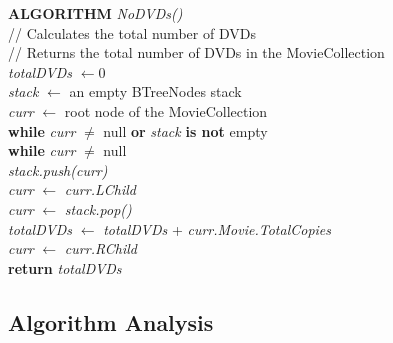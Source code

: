 \documentclass[12pt,a4paper]{article}
\begin{document}
			\textbf{ALGORITHM} \textit{NoDVDs()}\\
			\null\hspace{1cm}// Calculates the total number of DVDs\\
			\null\hspace{1cm}// Returns the total number of DVDs in the MovieCollection\\
			\null\hspace{1cm}\textit{totalDVDs} $\leftarrow 0$\\
			\null\hspace{1cm}\textit{stack} $\leftarrow$ an empty BTreeNodes stack\\
			\null\hspace{1cm}\textit{curr} $\leftarrow$ root node of the MovieCollection\\
			\null\hspace{1cm}\textbf{while} \textit{curr} $\neq$ null \textbf{or} 
			\textit{stack} \textbf{is not} empty\\
			\null\hspace{2cm}\textbf{while} \textit{curr} $\neq$ null\\
			\null\hspace{3cm}\textit{stack.push(curr)}\\
			\null\hspace{3cm}\textit{curr} $\leftarrow$ \textit{curr.LChild}\\
			\null\hspace{2cm}\textit{curr} $\leftarrow$ \textit{stack.pop()}\\
			\null\hspace{2cm}\textit{totalDVDs} $\leftarrow$ \textit{totalDVDs} + 
			\textit{curr.Movie.TotalCopies}\\
			\null\hspace{2cm}\textit{curr} $\leftarrow$ \textit{curr.RChild}\\
			\null\hspace{1cm}\textbf{return} \textit{totalDVDs}

		\subsection{Algorithm Analysis}
			
\end{document}
